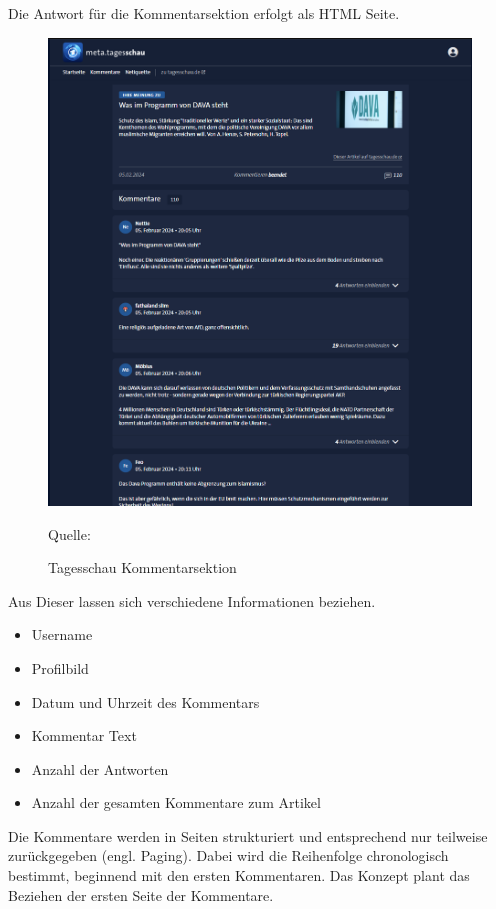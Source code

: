 Die Antwort für die Kommentarsektion erfolgt als HTML Seite. 
\begin{figure}
    \centering
    \includegraphics[width=1\linewidth]{abbildungen/Screenshot Comment Tagesschau.PNG}
    \caption{Tagesschau Kommentarsektion} 
    \label{fig:Tagesschau Kommentarsektion}
    Quelle: 
\end{figure}

Aus Dieser lassen sich verschiedene Informationen beziehen.
\begin{itemize}
    \item Username
    \item Profilbild
    \item Datum und Uhrzeit des Kommentars
    \item Kommentar Text
    \item Anzahl der Antworten
    \item Anzahl der gesamten Kommentare zum Artikel
\end{itemize}

Die Kommentare werden in Seiten strukturiert und entsprechend nur teilweise zurückgegeben (engl. Paging). Dabei wird die Reihenfolge chronologisch bestimmt, beginnend mit den ersten Kommentaren. Das Konzept plant das Beziehen der ersten Seite der Kommentare.

